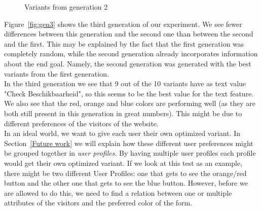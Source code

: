 \documentclass{report}
\begin{document}
\begin{figure}[ht]
	
	\caption{Variants from generation 2}
	\label{fig:gen2}
\end{figure}
\FloatBarrier

Figure~\ref{fig:gen3} shows the third generation of our experiment. We see fewer differences between this generation and the second one than between the second and the first. This may be explained by the fact that the first generation was completely random, while the second generation already incorporates information about the end goal. Namely, the second generation was generated with the best variants from the first generation.\\

In the third generation we see that 9 out of the 10 variants have as text value "Check Beschikbaarheid", so this seems to be the best value for the text feature. We also see that the red, orange and blue colors are performing well (as they are both still present in this generation in great numbers). This might be due to different preferences of the visitors of the website.\\

In an ideal world, we want to give each user their own optimized variant. In Section~\ref{Future work} we will explain how these different user preferences might be grouped together in \textit{user profiles}. By having multiple user profiles each profile would get their own optimized variant. If we look at this test as an example, there might be two different User Profiles: one that gets to see the orange/red button and the other one that gets to see the blue button. However, before we are allowed to do this, we need to find a relation between one or multiple attributes of the visitors and the preferred color of the form.\\
\end{document}
